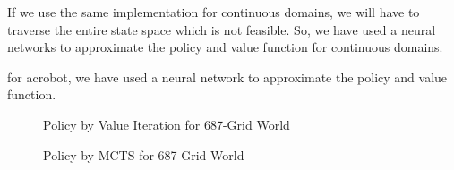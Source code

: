 \documentclass{article}
\begin{document}
If we use the same implementation for continuous domains, we will have to traverse the entire state space which is not feasible.
So, we have used a neural networks to approximate the policy and value function for continuous domains.

for acrobot, we have used a neural network to approximate the policy and value function.
\begin{figure}[H]
    \centering
    \begin{minipage}{0.48\textwidth}
        \centering
        \caption{Policy by Value Iteration for 687-Grid World}
        \label{fig:arrow_grid_value_iteration_mcts}
    \end{minipage}
    \hfill
    \begin{minipage}{0.48\textwidth}
        \centering
        \caption{Policy by MCTS for 687-Grid World}
        \label{fig:arrow_grid_mcts}
    \end{minipage}
\end{figure}
\end{document}
